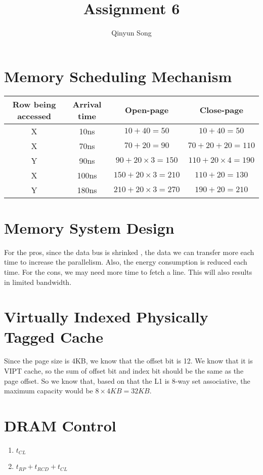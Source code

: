 \documentclass{article}
\title{Assignment 6}
\author{Qinyun Song}
\date{}
\begin{document}
    \maketitle

    \section{Memory Scheduling Mechanism}

    \begin{tabular}{|c|c|c|c|}
    \hline
    Row being accessed & Arrival time & Open-page & Close-page \\
    \hline
    X & 10ns & $10 + 40 = 50$ & $10 + 40 = 50$ \\
    \hline
    X & 70ns & $70 + 20 = 90$ & $70 + 20 + 20 = 110$ \\
    \hline
    Y & 90ns & $90 + 20 \times 3 = 150 $ & $110 + 20 \times 4 = 190$ \\
    \hline
    X & 100ns & $150 + 20 \times 3 = 210 $ & $110 + 20 = 130$ \\
    \hline
    Y & 180ns & $210 + 20 \times 3 = 270$ & $190 + 20 = 210$ \\
    \hline
    \end{tabular}

    \section{Memory System Design}
    For the pros, since the data bus is shrinked , the data we can transfer more each time to increase the parallelism. Also, the energy consumption is reduced each time. For the cons, we may need more time to fetch a line. This will also results in limited bandwidth.

    \section{Virtually Indexed Physically Tagged Cache}
    Since the page size is 4KB, we know that the offset bit is 12. We know that it is VIPT cache, so the sum of offset bit and index bit should be the same as the page offset. So we know that, based on that the L1 is 8-way set associative, the maximum capacity would be $8 \times 4KB = 32KB$.
    \section{DRAM Control}
    \begin{enumerate}
    \item $t_{CL}$
    \item $t_{RP} + t_{RCD} + t_{CL}$
    \end{enumerate}
\end{document}
